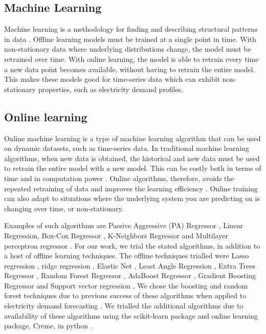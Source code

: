 \documentclass[final,3p,times,twocolumn,numbers]{elsarticle}
\begin{document}
\subsection{Machine Learning}

Machine learning is a methodology for finding and describing structural patterns in data \cite{Witten2011}. Offline learning models must be trained at a single point in time. With non-stationary data where underlying distributions change, the model must be retrained over time. With online learning, the model is able to retrain every time a new data point becomes available, without having to retrain the entire model. This makes these models good for time-series data which can exhibit non-stationary properties, such as electricity demand profiles.





\subsection{Online learning}

Online machine learning is a type of machine learning algorithm that can be used on dynamic datasets, such as time-series data. In traditional machine learning algorithms, when new data is obtained, the historical and new data must be used to retrain the entire model with a new model. This can be costly both in terms of time and in computation power \cite{Li2016}. Online algorithms, therefore, avoids the repeated retraining of data and improves the learning efficiency \cite{Rong2009}. Online training can also adapt to situations where the underlying system you are predicting on is changing over time, or non-stationary.

Examples of such algorithms are Passive Aggressive (PA) Regressor \cite{Gzik2014}, Linear Regression, Box-Cox Regressor \cite{Box1964}, K-Neighbors Regressor \cite{forgy65} and Multilayer perceptron regressor \cite{Hinton1989}. For our work, we trial the stated algorithms, in addition to a host of offline learning techniques. The offline techniques trialled were Lasso regression \cite{Tibshirani1996a}, ridge regression \cite{GeladiPaul1994Mrac},  Elastic Net \cite{Geostatistics2010}, Least Angle Regression \cite{Fike1988}, Extra Trees Regressor \cite{Fike1988}, Random Forest Regressor \cite{Breiman2001}, AdaBoost Regressor \cite{Freund1997}, Gradient Boosting Regressor \cite{316} and Support vector regression \cite{Cortes1995}. We chose the boosting and random forest techniques due to previous success of these algorithms when applied to electricity demand forecasting \cite{Kell2018}. We trialled the additional algorithms due to availability of these algorithms using the scikit-learn package and online learning package, Creme, in python \cite{scikit-learn,creme}. %
\end{document}
